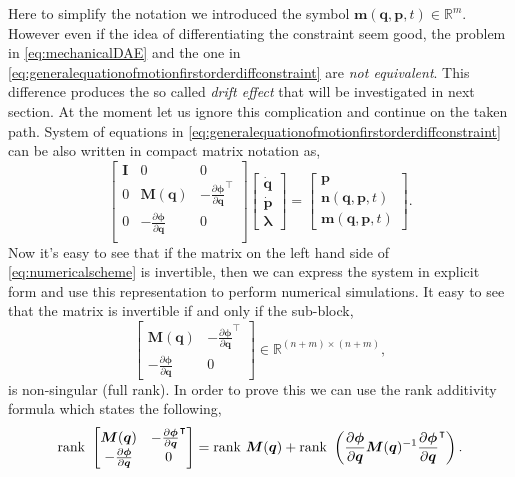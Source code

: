 Here to simplify the notation we introduced the symbol $\bm{m}(\bm{q},\bm{p},t)\in\mathbb{R}^{m}$.
However even if the idea of differentiating the constraint seem good,
the problem in \cref{eq:mechanicalDAE} and the one in
\cref{eq:generalequationofmotionfirstorderdiffconstraint} are
\emph{not equivalent}.
This difference produces the so called \emph{drift effect}
that will be investigated in next section.
At the moment let us ignore this complication and
continue on the taken path. System of equations in
\cref{eq:generalequationofmotionfirstorderdiffconstraint}
can be also written in compact matrix notation as,
\begin{equation}
	\label{eq:numericalscheme}
	\begin{bmatrix}
		\bm{I} 	&	0		&	0 \\
		0	& 	\bm{M}(\bm{q}) 	&	-\frac{\partial\bm{\phi}}{\partial\bm{q}}^{\intercal} \\
		0 	& -\frac{\partial\bm{\phi}}{\partial\bm{q}} & 0\\
	\end{bmatrix}
	\begin{bmatrix}
		\dot{\bm{q}}\\
		\dot{\bm{p}}\\
		\bm{\lambda}
	\end{bmatrix}
	= 
	\begin{bmatrix}
		\bm{p} \\
		\bm{n}(\bm{q},\bm{p},t) \\
		\bm{m}(\bm{q},\bm{p},t)
	\end{bmatrix}.
\end{equation}
Now it's easy to see that if the matrix on the left hand
side of \cref{eq:numericalscheme} is invertible,
then we can express the system in explicit form and use
this representation to perform numerical simulations. 		
It easy to see that the matrix is invertible if and only if the sub-block,
\begin{equation*}
	\begin{bmatrix}
		\bm{M}(\bm{q}) & -\frac{\partial\bm{\phi}}{\partial\bm{q}}^{\intercal} \\
		-\frac{\partial\bm{\phi}}{\partial\bm{q}} & 0
	\end{bmatrix}\in\mathbb{R}^{(n+m)\times(n+m)},
\end{equation*}
is non-singular (full rank). In order to prove this we can use
the rank additivity formula which states the following, 
\begin{equation*}
 	\mathrm{rank}~\begin{bmatrix}
 		\bm{M}(\bm{q}) & -\frac{\partial\bm{\phi}}{\partial\bm{q}}^{\intercal} \\
 		-\frac{\partial\bm{\phi}}{\partial\bm{q}} & 0
 	\end{bmatrix} 
 	= \mathrm{rank}~\bm{M}(\bm{q}) + 
	\mathrm{rank}~\left( \frac{\partial\bm{\phi}}{\partial\bm{q}}\bm{M}(\bm{q})^{-1}
	\frac{\partial\bm{\phi}}{\partial\bm{q}}^{\intercal}\right).
\end{equation*}
